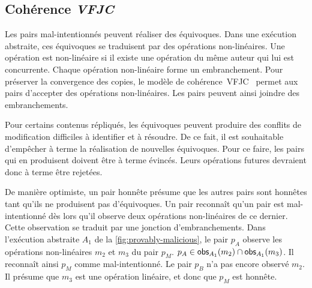 \subsection{Cohérence \emph{\acl{VFJC}}}

Les pairs mal-intentionnés peuvent réaliser des équivoques.
Dans une exécution abstraite, ces équivoques se traduisent par des opérations non-linéaires.
Une opération est non-linéaire si il existe une opération du même auteur qui lui est concurrente.
Chaque opération non-linéaire forme un embranchement.
Pour préserver la convergence des copies, le modèle de cohérence~\acf{VFJC}~\autocite{mahajan_2011_cac} permet aux pairs d'accepter des opérations non-linéaires.
Les pairs peuvent ainsi joindre des embranchements.

Pour certains contenus répliqués, les équivoques peuvent produire des conflits de modification difficiles à identifier et à résoudre.
De ce fait, il est souhaitable d'empêcher à terme la réalisation de nouvelles équivoques.
Pour ce faire, les pairs qui en produisent doivent être à terme évincés.
Leurs opérations futures devraient donc à terme être rejetées.

De manière optimiste, un pair honnête présume que les autres pairs sont honnêtes tant qu'ils ne produisent pas d'équivoques.
Un pair reconnaît qu'un pair est mal-intentionné dès lors qu'il observe deux opérations non-linéaires de ce dernier.
Cette observation se traduit par une jonction d'embranchements.
Dans l'exécution abstraite $A_1$ de la \autoref{fig:provably-malicious}, le pair $p_A$ observe les opérations non-linéaires $m_2$ et $m_3$ du pair $p_M$. $p_A \in \operatorname{\mathsf{obs}}_{A_1}(m_2) \cap \operatorname{\mathsf{obs}}_{A_1}(m_3)$.
Il reconnaît ainsi $p_M$ comme mal-intentionné.
Le pair $p_B$ n'a pas encore observé $m_2$. Il présume que $m_3$ est une opération linéaire, et donc que $p_M$ est honnête.

